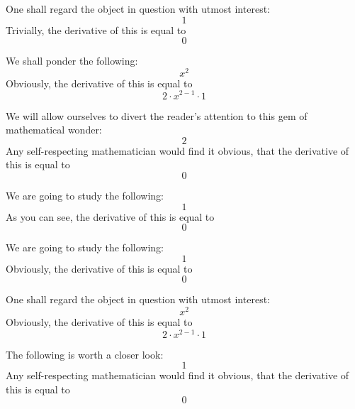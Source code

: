 \documentclass{article}
\begin{document}
One shall regard the object in question with utmost interest:
\begin{equation}
1 
\end{equation}
Trivially, the derivative of this is equal to
\begin{equation}
0 
\end{equation}

We shall ponder the following:
\begin{equation}
x ^{2 } 
\end{equation}
Obviously, the derivative of this is equal to
\begin{equation}
2 \cdot x ^{2 - 1 } \cdot 1 
\end{equation}

We will allow ourselves to divert the reader's attention to this gem of mathematical wonder:
\begin{equation}
2 
\end{equation}
Any self-respecting mathematician would find it obvious, that the derivative of this is equal to
\begin{equation}
0 
\end{equation}

We are going to study the following:
\begin{equation}
1 
\end{equation}
As you can see, the derivative of this is equal to
\begin{equation}
0 
\end{equation}

We are going to study the following:
\begin{equation}
1 
\end{equation}
Obviously, the derivative of this is equal to
\begin{equation}
0 
\end{equation}

One shall regard the object in question with utmost interest:
\begin{equation}
x ^{2 } 
\end{equation}
Obviously, the derivative of this is equal to
\begin{equation}
2 \cdot x ^{2 - 1 } \cdot 1 
\end{equation}

The following is worth a closer look:
\begin{equation}
1 
\end{equation}
Any self-respecting mathematician would find it obvious, that the derivative of this is equal to
\begin{equation}
0 
\end{equation}
\end{document}
